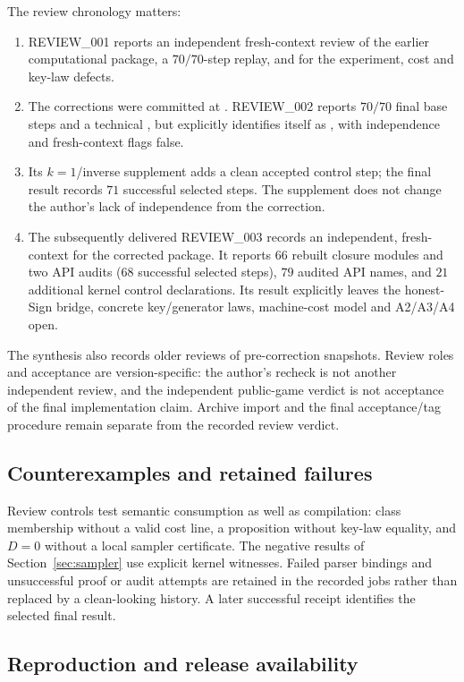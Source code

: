 The review chronology matters:
\begin{enumerate}
 \item REVIEW\_001 reports an independent fresh-context review of the
 earlier computational package, a $70/70$-step replay, and
  for the experiment, cost and key-law defects.
 \item The corrections were committed at .
 REVIEW\_002 reports $70/70$ final base steps and a technical
 , but explicitly identifies itself as
 , with independence and fresh-context flags false.
 \item Its $k=1$/inverse supplement adds a clean accepted control step;
 the final result records $71$ successful selected steps. The supplement
 does not change the author's lack of independence from the correction.
 \item The subsequently delivered REVIEW\_003 records an independent,
 fresh-context  for the corrected package. It reports
 $66$ rebuilt closure modules and two API audits ($68$ successful selected
 steps), $79$ audited API names, and $21$ additional kernel control
 declarations. Its result explicitly leaves the honest-Sign bridge,
 concrete key/generator laws, machine-cost model and A2/A3/A4 open.
\end{enumerate}
The synthesis also records older reviews of pre-correction snapshots.
Review roles and acceptance are version-specific: the author's recheck
is not another independent review, and the independent public-game
verdict is not acceptance of the final implementation claim.
Archive import and the final acceptance/tag procedure remain separate
from the recorded review verdict.

\subsection{Counterexamples and retained failures}
Review controls test semantic consumption as well as compilation:
class membership without a valid cost line, a proposition without
key-law equality, and $D=0$ without a local sampler certificate.
The negative results of Section~\ref{sec:sampler} use explicit
kernel witnesses. Failed parser bindings and unsuccessful proof or
audit attempts are retained in the recorded jobs rather than replaced
by a clean-looking history. A later successful receipt identifies the
selected final result.

\subsection{Reproduction and release availability}\label{app:release}
